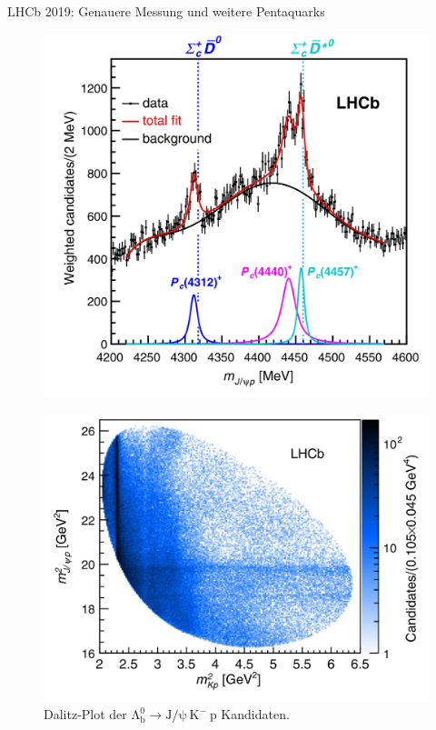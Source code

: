 \documentclass[aspectratio=169]{beamer} %
\begin{document}
      \begin{frame}{LHCb 2019: Genauere Messung und weitere Pentaquarks}
        \begin{minipage}{0.4\textwidth}
          \begin{figure}\includegraphics[width=\textwidth]{Images/76e29612-a8a4-4650-8573-5e331d33a362.jpg}
            \caption{\cite{Aaij.2019}}\end{figure}
        \end{minipage}
        \hfill
        \begin{minipage}{0.58\textwidth}
          \begin{figure}\includegraphics[width=\textwidth, height=0.5\textheight, keepaspectratio]{Images/e4479e29-be8d-4b9c-bfc4-f1747ace3818.jpg}\\[-3mm]{\scriptsize Dalitz-Plot der $\mathrm{\Lambda_b^0} \to \mathrm{J}/\mathrm{\psi}\:\mathrm{K}^-\:\mathrm{p}$ Kandidaten.}

\end{figure}
\end{minipage}
\end{frame}
\end{document}

